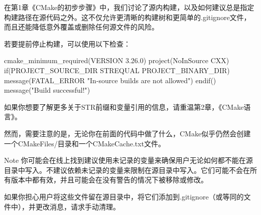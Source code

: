 
在第1章《CMake的初步步骤》中，我们讨论了源内构建，以及如何建议总是指定构建路径在源代码之外。这不仅允许更清晰的构建树和更简单的.gitignore文件，而且还能降低意外覆盖或删除任何源文件的风险。

若要提前停止构建，可以使用以下检查：


\begin{cmake}
cmake_minimum_required(VERSION 3.26.0)
project(NoInSource CXX)
if(PROJECT_SOURCE_DIR STREQUAL PROJECT_BINARY_DIR)
    message(FATAL_ERROR "In-source builds are not allowed")
endif()
message("Build successful!")
\end{cmake}

如果你想要了解更多关于STR前缀和变量引用的信息，请重温第2章，《CMake语言》。

然而，需要注意的是，无论你在前面的代码中做了什么，CMake似乎仍然会创建一个CMakeFiles/目录和一个CMakeCache.txt文件。

\begin{myNotic}{Note}
你可能会在线上找到建议使用未记录的变量来确保用户无论如何都不能在源目录中写入。不建议依赖未记录的变量来限制在源目录中写入。它们可能不会在所有版本中都有效，并且可能会在没有警告的情况下被移除或修改。
\end{myNotic}

如果你担心用户将这些文件留在源目录中，将它们添加到.gitignore（或等同的文件中），并更改消息，请求手动清理。
































